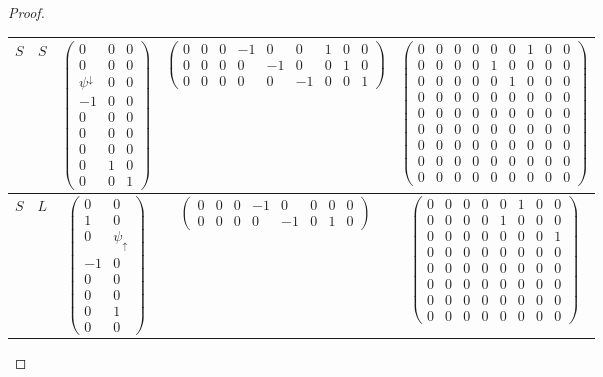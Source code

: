 \documentclass[11pt]{amsart}
\theoremstyle{definition}
\theoremstyle{remark}
\numberwithin{equation}{section}
\begin{document}
\begin{proof}
\begin{table}
\begin{tabular}{c|c|c|c|c}
	$S$ & $S$ & $\left(\begin{array}{ccc} 0 & 0 & 0 \\ 0 & 0 & 0 \\ \psi^{\downarrow} & 0 & 0 \\ -1 & 0 & 0 \\ 0 & 0 & 0 \\ 0 & 0 & 0 \\ 0 & 0 & 0 \\ 0 & 1 & 0 \\ 0 & 0 & 1 \end{array}\right)$ & $\left(\begin{array}{ccccccccc} 0 & 0 & 0 & -1 & 0 & 0 & 1 & 0 & 0 \\ 0 & 0 & 0 & 0 &-1 & 0 & 0 & 1 & 0 \\ 0 & 0 & 0 & 0 & 0 & -1 & 0 & 0 & 1 \end{array}\right)$  & $\left(\begin{array}{ccccccccc} 0 & 0 & 0 & 0 & 0 & 0 & 1 & 0 & 0 \\ 0 & 0 & 0 & 0 & 1 & 0 & 0 & 0 & 0 \\ 0 & 0 & 0 & 0 & 0 & 1 & 0 & 0 & 0  \\ 0 & 0 & 0 & 0 & 0 & 0 & 0 & 0 & 0  \\ 0 & 0 & 0 & 0 & 0 & 0 & 0 & 0 & 0 \\ 0 & 0 & 0 & 0 & 0 & 0 & 0 & 0 & 0 \\ 0 & 0 & 0 & 0 & 0 & 0 & 0 & 0 & 0 \\ 0 & 0 & 0 & 0 & 0 & 0 & 0 & 0 & 0 \\ 0 & 0 & 0 & 0 & 0 & 0 & 0 & 0 & 0 \end{array}\right)$  \\ \hline
	$S$ & $L$ & $\left(\begin{array}{cc} 0 & 0 \\ 1 & 0 \\ 0 & \psi_{\uparrow} \\ -1 & 0 \\ 0 & 0 \\ 0 & 0 \\ 0 & 1 \\ 0 & 0\end{array}\right)$ & $\left(\begin{array}{cccccccc} 0 & 0 & 0 & -1 & 0 & 0 & 0 & 0 \\ 0 & 0 & 0 & 0 & -1 & 0 & 1 & 0\end{array}\right)$ & $\left( \begin{array}{cccccccc} 0 & 0 & 0 & 0 & 0 & 1 & 0 & 0 \\ 0 & 0 & 0 & 0 & 1 & 0 & 0 & 0 \\ 0 & 0 & 0 & 0 & 0 & 0 & 0 & 1 \\ 0 & 0 & 0 & 0 & 0 & 0 & 0 & 0 \\ 0 & 0 & 0 & 0 & 0 & 0 & 0 & 0 \\ 0 & 0 & 0 & 0 & 0 & 0 & 0 & 0 \\ 0 & 0 & 0 & 0 & 0 & 0 & 0 & 0 \\ 0 & 0 & 0 & 0 & 0 & 0 & 0 & 0 \end{array}\right)$  \\ \hline

\end{tabular}
\end{table}
\end{proof}
\end{document}
